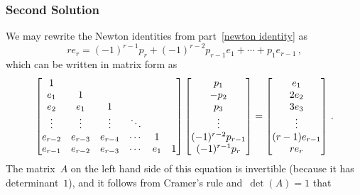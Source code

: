 \subsubsection{Second Solution}

We may rewrite the Newton identities from part~\ref{newton identity} as
\[
    r e_r
  =   (-1)^{r-1} p_r
    + (-1)^{r-2} p_{r-1} e_1
    + \dotsb
    + p_1 e_{r-1} \,,
\]
which can be written in matrix form as
\[
  \begin{bmatrix}
    1       &         &         &         &     &   \\
    e_1     & 1       &         &         &     &   \\
    e_2     & e_1     & 1       &         &     &   \\
    \vdots  & \vdots  & \vdots  & \ddots  &     &   \\
    e_{r-2} & e_{r-3} & e_{r-4} & \cdots  & 1   &   \\
    e_{r-1} & e_{r-2} & e_{r-3} & \cdots  & e_1 & 1
  \end{bmatrix}
  \begin{bmatrix} p_1 \\ -p_2 \\ p_3 \\ \vdots \\ (-1)^{r-2} p_{r-1} \\ (-1)^{r-1} p_r \end{bmatrix}
  =
  \begin{bmatrix} e_1 \\ 2 e_2 \\ 3 e_3 \\ \vdots \\ (r-1) e_{r-1} \\ r e_r \end{bmatrix} \,.
\]
The matrix~$A$ on the left hand side of this equation is invertible (because it has determinant~$1$), and it follows from Cramer’s rule and~$\det(A) = 1$ that
\begingroup
\allowdisplaybreaks
